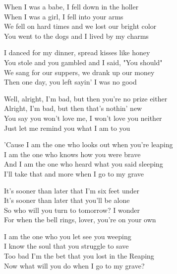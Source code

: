 
\ve{}
When I was a babe, I fell down in the holler\\
When I was a girl, I fell into your arms\\
We fell on hard times and we lost our bright color\\
You went to the dogs and I lived by my charms

\ve{}

I danced for my dinner, spread kisses like honey\\
You stole and you gambled and I said, "You should"\\
We sang for our suppers, we drank up our money\\
Then one day, you left sayin' I was no good

\ve{}

Well, alright, I'm bad, but then you're no prize either\\
Alright, I'm bad, but then that's nothin' new\\
You say you won't love me, I won't love you neither\\
Just let me remind you what I am to you

\ve{}

'Cause I am the one who looks out when you're leaping\\
I am the one who knows how you were brave\\
And I am the one who heard what you said sleeping\\
I'll take that and more when I go to my grave

\ve{}

It's sooner than later that I'm six feet under\\
It's sooner than later that you'll be alone\\
So who will you turn to tomorrow? I wonder\\
For when the bell rings, lover, you're on your own

\ve{}

I am the one who you let see you weeping\\
I know the soul that you struggle to save\\
Too bad I'm the bet that you lost in the Reaping\\
Now what will you do when I go to my grave?

\esong{}
